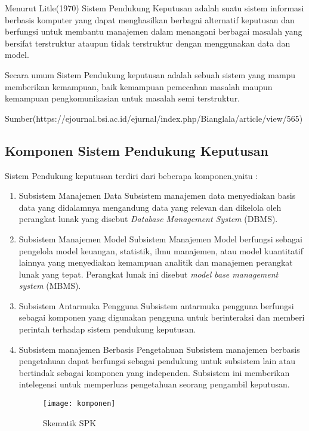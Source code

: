 Menurut Litle(1970) Sistem Pendukung Keputusan adalah suatu sistem informasi berbasis komputer yang dapat menghasilkan berbagai alternatif keputusan dan berfungsi untuk membantu manajemen dalam menangani berbagai masalah yang bersifat terstruktur ataupun tidak terstruktur dengan menggunakan data dan model.

Secara umum Sistem Pendukung keputusan adalah sebuah sistem yang mampu memberikan kemampuan, baik kemampuan pemecahan masalah maupun kemampuan pengkomunikasian untuk masalah semi terstruktur.

Sumber(https://ejournal.bsi.ac.id/ejurnal/index.php/Bianglala/article/view/565)

\subsection{Komponen Sistem Pendukung Keputusan}

Sistem Pendukung keputusan terdiri dari beberapa komponen,yaitu :
\begin{enumerate}
	\item Subsistem Manajemen Data
Subsistem manajemen data menyediakan basis data yang didalamnya mengandung data yang relevan dan dikelola oleh perangkat lunak yang disebut \textit{Database Management System} (DBMS).
	\item Subsistem Manajemen Model
Subsistem Manajemen Model berfungsi sebagai pengelola model keuangan, statistik, ilmu manajemen, atau model kuantitatif lainnya yang menyediakan kemampuan analitik dan manajemen perangkat lunak yang tepat. Perangkat lunak ini disebut \textit{model base management system} (MBMS).
	\item Subsistem Antarmuka Pengguna
Subsistem antarmuka pengguna berfungsi sebagai komponen yang digunakan pengguna untuk berinteraksi dan memberi perintah terhadap sistem pendukung keputusan. 
	\item Subsistem manajemen Berbasis Pengetahuan
Subsistem manajemen berbasis pengetahuan dapat berfungsi sebagai pendukung untuk subsistem lain atau bertindak sebagai komponen yang independen. Subsistem ini memberikan intelegensi untuk memperluas pengetahuan seorang pengambil keputusan.

\begin{figure}[H]
	\centering  
	\texttt{[image: komponen]}  
	\caption[Skematik SPK]{Skematik SPK} 
	\label{fig:komponen} 
\end{figure}

\end{enumerate}
	
